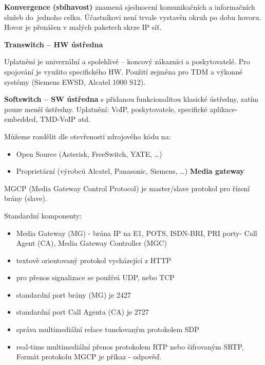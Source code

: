 
\textbf{Konvergence (sbíhavost)} znamená sjednocení komunikačních a informačních služeb do~jednoho celku.
Účastníkovi není trvale vystavěn okruh po dobu hovoru.
Hovor je přenášen v malých paketech skrze IP síť.


\textbf{Transwitch -- HW ústředna}

Uplatnění je univerzální a spolehlivé -- koncový zákazníci a poskytovatelé.
Pro spojování je využito specifického HW.
Použití zejména pro TDM a výkonné systémy (Siemens EWSD, Alcatel 1000 S12).

\textbf{Softswitch -- SW ústředna} s přidanou funkcionalitou klasické ústředny, zatím pouze menší ústředny. Uplatnění: VoIP, poskytovatele, specifické aplikace-embedded, TMD-VoIP atd.

Můžeme rozdělit dle otevřenosti zdrojového kódu na:
\begin{itemize}[noitemsep]
    \item Open Source (Asterisk, FreeSwitch, YATE, \ldots)
    \item Proprietární (výrobců Alcatel, Panasonic, Siemens, \ldots) \textbf{Media gateway}
\end{itemize}

\noindent MGCP (Media Gateway Control Protocol) je master/slave protokol pro řízení brány (slave).

Standardní komponenty:
\begin{itemize}[noitemsep]
    \item Media Gateway (MG) - brána IP na E1, POTS, ISDN-BRI, PRI porty- Call Agent (CA), Media Gateway Controller (MGC)
    \item textově orientovaný protokol vycházející z HTTP
    \item pro přenos signalizace se používá UDP, nebo TCP
    \item standardní port brány (MG) je 2427
    \item standardní port Call Agenta (CA) je 2727
    \item správa multimediální relace tunelovaným protokolem SDP
    \item real-time multimediální přenos protokolem RTP nebo šifrovaným SRTP, Formát protokolu MGCP je příkaz - odpověď.
\end{itemize}


